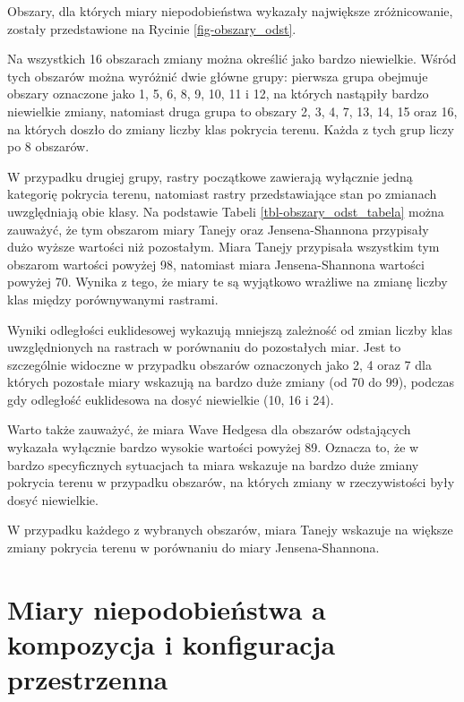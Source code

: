 \documentclass{amuthesis}
\begin{document}
Obszary, dla których miary niepodobieństwa wykazały największe
zróżnicowanie, zostały przedstawione na Rycinie \ref{fig-obszary_odst}.

Na wszystkich 16 obszarach zmiany można określić jako bardzo niewielkie.
Wśród tych obszarów można wyróżnić dwie główne grupy: pierwsza grupa
obejmuje obszary oznaczone jako 1, 5, 6, 8, 9, 10, 11 i 12, na których
nastąpiły bardzo niewielkie zmiany, natomiast druga grupa to obszary 2,
3, 4, 7, 13, 14, 15 oraz 16, na których doszło do zmiany liczby klas
pokrycia terenu. Każda z tych grup liczy po 8 obszarów.

W przypadku drugiej grupy, rastry początkowe zawierają wyłącznie jedną
kategorię pokrycia terenu, natomiast rastry przedstawiające stan po
zmianach uwzględniają obie klasy. Na podstawie Tabeli
\ref{tbl-obszary_odst_tabela} można zauważyć, że tym obszarom miary
Tanejy oraz Jensena-Shannona przypisały dużo wyższe wartości niż
pozostałym. Miara Tanejy przypisała wszystkim tym obszarom wartości
powyżej 98, natomiast miara Jensena-Shannona wartości powyżej 70. Wynika
z tego, że miary te są wyjątkowo wrażliwe na zmianę liczby klas między
porównywanymi rastrami.

Wyniki odległości euklidesowej wykazują mniejszą zależność od zmian
liczby klas uwzględnionych na rastrach w porównaniu do pozostałych miar.
Jest to szczególnie widoczne w przypadku obszarów oznaczonych jako 2, 4
oraz 7 dla których pozostałe miary wskazują na bardzo duże zmiany (od 70
do 99), podczas gdy odległość euklidesowa na dosyć niewielkie (10, 16 i
24).

Warto także zauważyć, że miara Wave Hedgesa dla obszarów odstających
wykazała wyłącznie bardzo wysokie wartości powyżej 89. Oznacza to, że w
bardzo specyficznych sytuacjach ta miara wskazuje na bardzo duże zmiany
pokrycia terenu w przypadku obszarów, na których zmiany w rzeczywistości
były dosyć niewielkie.

W przypadku każdego z wybranych obszarów, miara Tanejy wskazuje na
większe zmiany pokrycia terenu w porównaniu do miary Jensena-Shannona.

\hypertarget{miary-niepodobieux144stwa-a-kompozycja-i-konfiguracja-przestrzenna}{%
\section{Miary niepodobieństwa a kompozycja i konfiguracja
przestrzenna}\label{miary-niepodobieux144stwa-a-kompozycja-i-konfiguracja-przestrzenna}}
\end{document}
